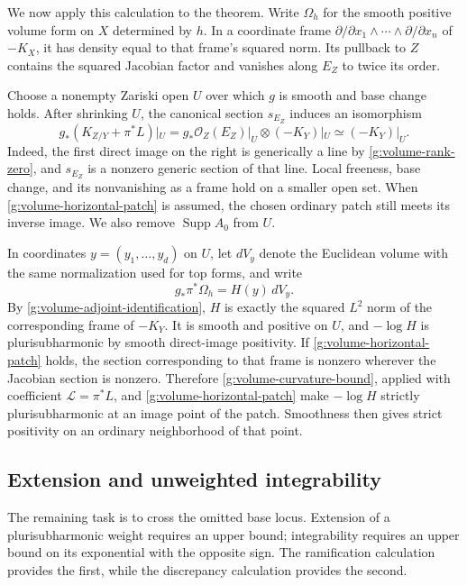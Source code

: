 We now apply this calculation to the theorem.  Write $\Omega_h$ for
the smooth positive volume form on $X$ determined by $h$.  In a
coordinate frame $\partial/\partial x_1\wedge\cdots\wedge
\partial/\partial x_n$ of $-K_X$, it has density equal to that
frame's squared norm.  Its pullback to $Z$ contains the squared
Jacobian factor and vanishes along $E_Z$ to twice its order.

Choose a nonempty Zariski open $U$ over which $g$ is smooth and
base change holds.  After shrinking $U$, the canonical section
$s_{E_Z}$ induces an
isomorphism
\begin{equation}\label{g:volume-adjoint-identification}
 g_*(K_{Z/Y}+\pi^*L)|_U
 =g_*\mathcal O_Z(E_Z)|_U\otimes(-K_Y)|_U
 \simeq(-K_Y)|_U.
\end{equation}
Indeed, the first direct image on the right is generically a line
by \eqref{g:volume-rank-zero}, and $s_{E_Z}$ is a nonzero generic
section of that line.  Local freeness, base change, and its
nonvanishing as a frame hold on a smaller open set.  When
\eqref{g:volume-horizontal-patch} is assumed, the chosen ordinary
patch still meets its inverse image.  We also remove
$\operatorname{Supp}A_0$ from $U$.

In coordinates $y=(y_1,\ldots,y_d)$ on $U$, let $dV_y$ denote the
Euclidean volume with the same normalization used for top forms, and
write
\begin{equation}\label{g:volume-density}
 g_*\pi^*\Omega_h=H(y)\,dV_y.
\end{equation}
By \eqref{g:volume-adjoint-identification}, $H$ is exactly the squared
$L^2$ norm of the corresponding frame of $-K_Y$.  It is smooth and
positive on $U$, and $-\log H$ is plurisubharmonic by smooth
direct-image positivity.  If \eqref{g:volume-horizontal-patch} holds,
the section corresponding to that frame is
nonzero wherever the Jacobian section is nonzero.  Therefore
\eqref{g:volume-curvature-bound}, applied with coefficient
$\mathcal L=\pi^*L$, and
\eqref{g:volume-horizontal-patch} make $-\log H$ strictly
plurisubharmonic at an image point of the patch.  Smoothness then gives
strict positivity on an ordinary neighborhood of that point.

\subsection{Extension and unweighted integrability}

The remaining task is to cross the omitted base locus.  Extension of a
plurisubharmonic weight requires an upper bound; integrability requires
an upper bound on its exponential with the opposite sign.  The
ramification calculation provides the first, while the discrepancy
calculation provides the second.

